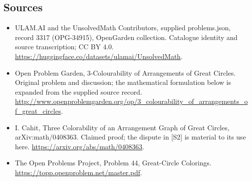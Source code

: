 \documentclass[11pt,a4paper]{article}
\begin{document}
\subsection{Sources}
\begin{itemize}
\item[S1] ULAM.AI and the UnsolvedMath Contributors, supplied problems.json, record 3317 (OPG-34915), OpenGarden collection. Catalogue identity and source transcription; CC BY 4.0.
\url{https://huggingface.co/datasets/ulamai/UnsolvedMath}.
\item[S2] Open Problem Garden, 3-Colourability of Arrangements of Great Circles. Original problem and discussion; the mathematical formulation below is expanded from the supplied source record.
\url{http://www.openproblemgarden.org/op/3_colourability_of_arrangements_of_great_circles}.

\item[R1] I. Cahit, Three Colorability of an Arrangement Graph of Great
Circles, arXiv:math/0408363. Claimed proof;
the dispute in [S2] is material to its use here.
\url{https://arxiv.org/abs/math/0408363}.
\item[R2] The Open Problems Project, Problem 44, Great-Circle Colorings.
\url{https://topp.openproblem.net/master.pdf}.

\end{itemize}
\end{document}
